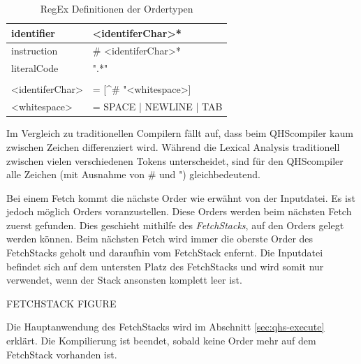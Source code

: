 \begin{table}[h]
    \centering
    \caption{RegEx Definitionen der Ordertypen}
    \vspace{3mm} %
    
    \begin{tabular}{ll}
    \multicolumn{1}{l|}{identifier}        & \textless{}identiferChar\textgreater{}*                           \\ \hline
    \multicolumn{1}{l|}{instruction}       & \# \textless{}identiferChar\textgreater{}*                        \\ \hline
    \multicolumn{1}{l|}{literalCode}       & ".*"                                                              \\
                                           &                                                                   \\
    \textless{}identiferChar\textgreater{} & = {[}\textasciicircum{}\# "\textless{}whitespace\textgreater{}{]} \\
    \textless{}whitespace\textgreater{}    & = SPACE | NEWLINE | TAB
    
    \end{tabular}
\end{table}

Im Vergleich zu traditionellen Compilern fällt auf, dass beim QHScompiler kaum zwischen Zeichen differenziert wird. Während die Lexical Analysis traditionell zwischen vielen verschiedenen Tokens unterscheidet,
sind für den QHScompiler alle Zeichen (mit Ausnahme von \# und ") gleichbedeutend.

Bei einem Fetch kommt die nächste Order wie erwähnt von der Inputdatei.
Es ist jedoch möglich Orders voranzustellen. Diese Orders werden beim nächsten Fetch zuerst gefunden. Dies geschieht mithilfe des \textit{FetchStacks}, auf den Orders gelegt werden können.
Beim nächsten Fetch wird immer die oberste Order des FetchStacks geholt und daraufhin vom FetchStack enfernt.
Die Inputdatei befindet sich auf dem untersten Platz des FetchStacks und wird somit nur verwendet, wenn der Stack ansonsten komplett leer ist.

FETCHSTACK FIGURE

%
%
Die Hauptanwendung des FetchStacks wird im Abschnitt \ref{sec:qhs-execute} erklärt.
Die Kompilierung ist beendet, sobald keine Order mehr auf dem FetchStack vorhanden ist.

